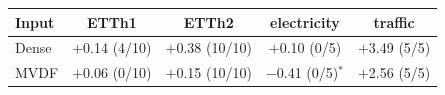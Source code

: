 \begin{tabular}{|l|c|c|c|c|}
\hline
Input & ETTh1 & ETTh2 & electricity & traffic \\
\hline
Dense & $+$0.14 (4/10) & $+$0.38 (10/10) & $+$0.10 (0/5) & $+$3.49 (5/5) \\
MVDF & $+$0.06 (0/10) & $+$0.15 (10/10) & $-$0.41 (0/5)$^{*}$ & $+$2.56 (5/5) \\
\hline
\end{tabular}

